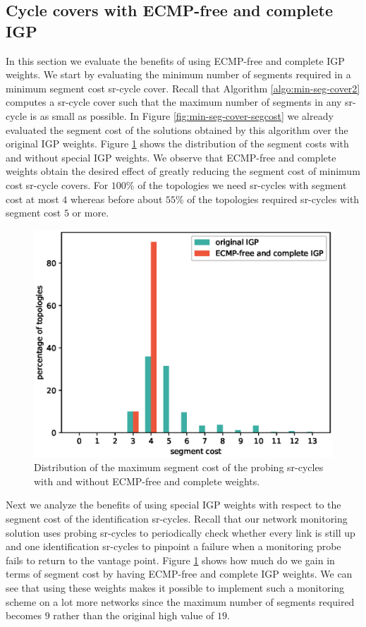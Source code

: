 \subsection{Cycle covers with ECMP-free and complete IGP}

In this section we evaluate the benefits of using ECMP-free and complete IGP weights.
We start by evaluating the minimum number of segments required in a minimum segment cost
sr-cycle cover. Recall that Algorithm \ref{algo:min-seg-cover2} computes a sr-cycle cover such
that the maximum number of segments in any sr-cycle is as small as possible. In Figure 
\ref{fig:min-seg-cover-segcost} we already evaluated the segment cost of the solutions obtained 
by this algorithm over the original IGP weights. Figure \ref{fig:min-seg-cost-segcost-new} shows
the distribution of the segment costs with and without special IGP weights. We observe that ECMP-free
and complete weights obtain the desired effect of greatly reducing the segment cost of minimum
cost sr-cycle covers. For $100\%$ of the topologies we need sr-cycles with segment cost at most $4$ whereas before
about $55\%$ of the topologies required sr-cycles with segment cost $5$ or more.

\begin{figure}
\begin{center}
\includegraphics[width=.85\columnwidth]{./Network-lib/data/plot/minSegCover_segcost_complete.eps}
\end{center}
\caption{Distribution of the maximum segment cost of the probing sr-cycles with and without ECMP-free and complete weights.}
\label{fig:min-seg-cost-segcost-new}
\end{figure}

Next we analyze the benefits of using special IGP weights with respect to the segment cost of the 
identification sr-cycles. Recall that our network monitoring solution uses probing sr-cycles to periodically
check whether every link is still up and one identification sr-cycles to pinpoint a failure when
a monitoring probe fails to return to the vantage point. Figure \ref{fig:min-seg-cost-segcost-new}
shows how much do we gain in terms of segment cost by having ECMP-free and complete IGP weights. We can see that
using these weights makes it possible to implement such a monitoring scheme on a lot more networks since the maximum
number of segments required becomes $9$ rather than the original high value of $19$.

